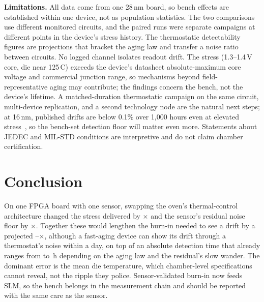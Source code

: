 \documentclass[10pt,twocolumn]{article}
\newcommand{\degC}{\,\textdegree C}
\begin{document}
\textbf{Limitations.} All data come from one 28\,nm board, so bench effects are established within one device, not as population statistics. The two comparisons use different monitored circuits, and the paired runs were separate campaigns at different points in the device's stress history. The thermostatic detectability figures are projections that bracket the aging law and transfer a noise ratio between circuits. No logged channel isolates readout drift. The stress (1.3--1.4\,V core, die near 125\degC) exceeds the device's datasheet absolute-maximum core voltage and commercial junction range, so mechanisms beyond field-representative aging may contribute; the findings concern the bench, not the device's lifetime. A matched-duration thermostatic campaign on the same circuit, multi-device replication, and a second technology node are the natural next steps; at 16\,nm, published drifts are below 0.1\% over 1,000 hours even at elevated stress~\cite{sobas}, so the bench-set detection floor will matter even more. Statements about JEDEC and MIL-STD conditions are interpretive and do not claim chamber certification.


\section{Conclusion}

On one FPGA board with one sensor, swapping the oven's thermal-control architecture changed the stress delivered by \vAFratio$\times$ and the sensor's residual noise floor by \vSigRawRatio$\times$. Together these would lengthen the burn-in needed to see a drift by a projected \vPenLow--\vPenHigh$\times$, although a fast-aging device can show its drift through a thermostat's noise within a day, on top of an absolute detection time that already ranges from \vTminSeq{} to \vTminLrv\,h depending on the aging law and the residual's slow wander. The dominant error is the mean die temperature, which chamber-level specifications cannot reveal, not the ripple they police. Sensor-validated burn-in now feeds SLM, so the bench belongs in the measurement chain and should be reported with the same care as the sensor.
\end{document}
